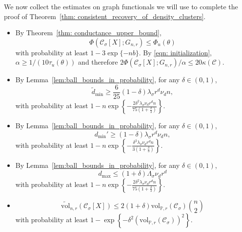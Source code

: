 \documentclass[11pt,twoside]{article}
\theoremstyle{definition}
\newcommand{\set}[1]{\left\{#1\right\}}
\newcommand{\vol}{\mathrm{vol}}
\newcommand{\1}{\mathbbm{1}}
\newcommand{\Phibf}{\Phi_{u}}
\newcommand{\taubf}{\tau_{u}}
\newcommand{\Xbf}{X}
\newcommand{\Pbb}{\mathbb{P}}
\newcommand{\Cset}{\mathcal{C}}
\newcommand{\Csig}{\Cset_{\sigma}}
\newcommand{\degminpr}{d_{\min}'}
\newcommand{\degminwt}{\widetilde{d}_{\min}}
\begin{document}
We now collect the estimates on graph functionals we will use to complete the proof of Theorem~\ref{thm: consistent_recovery_of_density_clusters}. 
\begin{itemize}
	\item By Theorem~\ref{thm: conductance_upper_bound},
	\begin{equation*}
	\Phi(\Csig[\Xbf]; G_{n,r}) \leq \Phibf(\theta) 
	\end{equation*}
	with probability at least $1 - 3\exp\{-nb\}$. By \eqref{eqn: initialization}, $\alpha \geq 1/(10 \taubf(\theta))$ and therefore $2 \Phi(\Csig[\Xbf]; G_{n,r})/\alpha \leq 20 \kappa(\Cset)$.
	\item By Lemma~\ref{lem:ball_bounds_in_probability}, for any $\delta \in (0,1)$,
	\begin{equation*}
	\degminwt \geq \frac{6}{25}(1 - \delta) \lambda_{\sigma} r^d \nu_d n,
	\end{equation*}
	with probability at least $1 - n\exp\set{-\frac{2 \delta^2 \lambda_{\sigma} \nu_d r^d n}{75(1 + \frac{\delta}{3})}}$.
	\item By Lemma~\ref{lem:ball_bounds_in_probability}, for any $\delta \in (0,1)$,
	\begin{equation*}
	\degminpr \geq (1 - \delta) \lambda_{\sigma} r^d \nu_d n,
	\end{equation*}
	with probability at least $1 - n\exp\set{-\frac{\delta^2 \lambda_{\sigma} \nu_d r^d n}{3(1 + \frac{\delta}{3})}}$.
	
	\item By Lemma~\ref{lem:ball_bounds_in_probability}, for any $\delta \in (0,1)$,
	\begin{equation*}
	d_{\max} \leq (1 + \delta) \Lambda_{\sigma} \nu_d r^d
	\end{equation*}
	with probability at least $1 - n\exp\set{-\frac{2\delta^2 \lambda_{\sigma} \nu_d r^d n}{75(1 + \frac{\delta}{3})}}$.
	
	\item 
	\begin{equation*}
	\widetilde{\vol}_{n,r}(\Csig[\Xbf]) \leq 2(1 + \delta) \vol_{\Pbb,r}(\Csig){n \choose 2}
	\end{equation*}
	with probability at least $1 - \exp\set{-\delta^2 (\vol_{\Pbb,r}(\Csig))^2}$.
\end{itemize}
\end{document}
